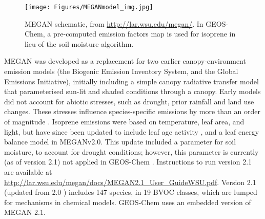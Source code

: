     \begin{figure}
      \texttt{[image: Figures/MEGANmodel\_img.jpg]}
      \caption{%
        MEGAN schematic, from \url{http://lar.wsu.edu/megan/}.
        In GEOS-Chem, a pre-computed emission factors map is used for isoprene in lieu of the soil moisture algorithm.
      }
      \label{Model:GC:Isop:MEGAN:fig_megan_schematic}
    \end{figure}
    
    MEGAN was developed as a replacement for two earlier canopy-environment emission models (the Biogenic Emission Inventory System, and the Global Emissions Initiative), initially including a simple canopy radiative transfer model that parameterised sun-lit and shaded conditions through a canopy.
    Early models did not account for abiotic stresses, such as drought, prior rainfall and land use changes. 
    These stresses influence species-specific emissions by more than an order of magnitude \parencite{Niinemets1999}.
    Isoprene emissions were based on temperature, leaf area, and light, but have since been updated to include leaf age activity \parencite{Guenther2000}, and a leaf energy balance model \parencite{Guenther2006} in MEGANv2.0.
    This update included a parameter for soil moisture, to account for drought conditions; however, this parameter is currently (as of version 2.1) not applied in GEOS-Chem \parencite{Sindelarova2014}.
    Instructions to run version 2.1 are available at \url{http://lar.wsu.edu/megan/docs/MEGAN2.1_User_GuideWSU.pdf}.
    Version 2.1 (updated from 2.0 \parencite{Guenther2006}) includes 147 species, in 19 BVOC classes, which are lumped for mechanisms in chemical models.
    GEOS-Chem uses an embedded version of MEGAN 2.1.
    

